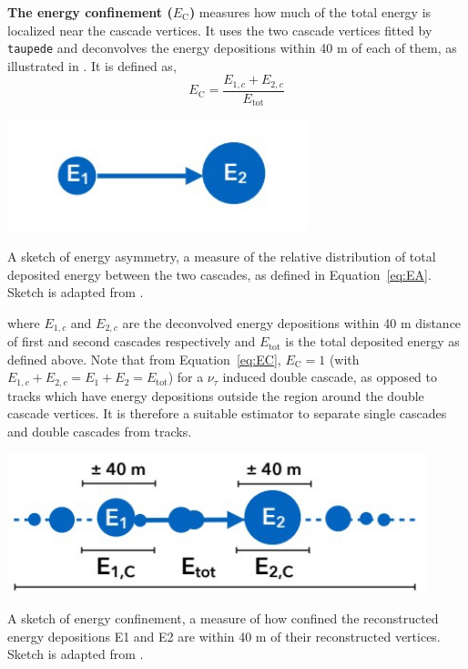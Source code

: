 \textbf{The energy confinement ($E_{\text{C}}$)} measures how much of the total energy is localized near the cascade vertices. It uses the two cascade vertices fitted by \texttt{taupede} and deconvolves the energy depositions within 40 m of each of them, as illustrated in . It is defined as,
\begin{equation}\label{eq:EC}
    E_{\mathrm{C}} = \frac{E_{1,c}+E_{2,c}}{E_{\mathrm{tot}}}
\end{equation}
\begin{marginfigure}
	\includegraphics{./figures/EventSample/EA.pdf}
	\caption[A sketch of energy asymmetry]{A sketch of energy asymmetry, a measure of the relative distribution of total deposited energy between the two cascades, as defined in Equation~\ref{eq:EA}. Sketch is adapted from \cite{marcel_thesis}.}
\end{marginfigure}
where $E_{1,c}$ and $E_{2,c}$ are the deconvolved energy depositions within 40 m distance of first and second cascades respectively and $E_{\mathrm{tot}}$ is the total deposited energy as defined above. Note that from Equation~\ref{eq:EC}, $E_{\mathrm{C}}=1$ (with $E_{1,c}+E_{2,c}=E_1+E_2=E_{\mathrm{tot}}$) for a $\nu_{\tau}$ induced double cascade, as opposed to tracks which have energy depositions outside the region around the double cascade vertices. It is therefore a suitable estimator to separate single cascades and double cascades from tracks.
\begin{marginfigure}
	\includegraphics{./figures/EventSample/EC.pdf}
	\caption[A sketch of energy confinement]{A sketch of energy confinement, a measure of how confined the reconstructed energy depositions E1 and E2 are within 40 m of their reconstructed vertices. Sketch is adapted from \cite{marcel_thesis}.}
\end{marginfigure}

